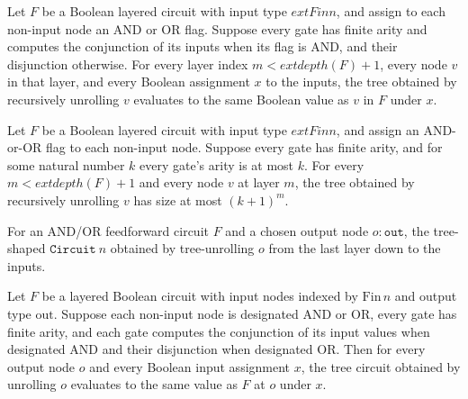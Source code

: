 \begin{theorem}
\label{BoolCircuit.nodeToTreeCircuit_eval}
\leanok
{}
Let $F$ be a Boolean layered circuit with input type $	ext{Fin }n$, and assign to each
non-input node an AND or OR flag. Suppose every gate has finite arity and computes the
conjunction of its inputs when its flag is AND, and their disjunction otherwise. For
every layer index $m<	ext{depth}(F)+1$, every node $v$ in that layer, and every Boolean
assignment $x$ to the inputs, the tree obtained by recursively unrolling $v$ evaluates
to the same Boolean value as $v$ in $F$ under $x$.
\end{theorem}

\begin{theorem}
\label{BoolCircuit.nodeToTreeCircuit_size_le}
\leanok
{}
Let $F$ be a Boolean layered circuit with input type $	ext{Fin }n$, and assign an
AND-or-OR flag to each non-input node. Suppose every gate has finite arity, and for some
natural number $k$ every gate's arity is at most $k$. For every $m<	ext{depth}(F)+1$ and
every node $v$ at layer $m$, the tree obtained by recursively unrolling $v$ has size at
most $(k+1)^m$.
\end{theorem}

\begin{definition}
\label{BoolCircuit.LayeredCircuit.toTreeCircuit}
\leanok
{}
For an AND/OR feedforward circuit $F$ and a chosen output node $o : \texttt{out}$,
the tree-shaped $\texttt{Circuit}\ n$ obtained by tree-unrolling $o$ from the last
layer down to the inputs.
\end{definition}

\begin{theorem}
\label{BoolCircuit.LayeredCircuit.toTreeCircuit_eval}
\leanok
{}
Let $F$ be a layered Boolean circuit with input nodes indexed by $\mathrm{Fin}\,n$ and
output type $\mathrm{out}$. Suppose each non-input node is designated AND or OR, every
gate has finite arity, and each gate computes the conjunction of its input values when
designated AND and their disjunction when designated OR. Then for every output node $o$
and every Boolean input assignment $x$, the tree circuit obtained by unrolling $o$
evaluates to the same value as $F$ at $o$ under $x$.
\end{theorem}

